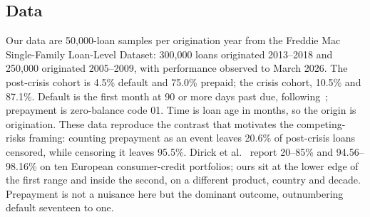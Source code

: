 \documentclass[11pt,journal]{IEEEtran}
\begin{document}
\subsection{Data}
Our data are 50{,}000-loan samples per origination year from the Freddie Mac
Single-Family Loan-Level Dataset: 300{,}000 loans originated 2013--2018 and
250{,}000 originated 2005--2009, with performance observed to March 2026. The
post-crisis cohort is 4.5\% default and 75.0\% prepaid; the crisis cohort, 10.5\%
and 87.1\%. Default is the first month at 90 or more days past due,
following~\cite{DBLP:journals/jors/BlumenstockLS22}; prepayment is zero-balance
code 01. Time is loan age in months, so the origin is origination.
These data reproduce the contrast that motivates the competing-risks framing:
counting prepayment as an event leaves 20.6\% of post-crisis loans censored,
while censoring it leaves 95.5\%. Dirick et al.~\cite{DBLP:journals/jors/DirickCB17} report 20--85\% and
94.56--98.16\% on ten European consumer-credit portfolios; ours sit at the lower
edge of the first range and inside the second, on a different product, country
and decade. Prepayment is not a nuisance here but the dominant outcome,
outnumbering default seventeen to one.
\end{document}
